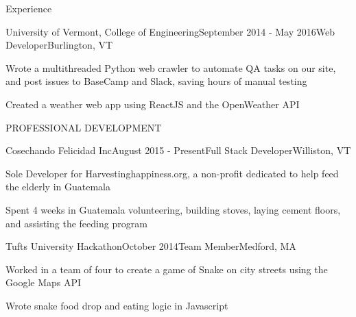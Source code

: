 \documentclass{resume} %
\begin{document}
\begin{rSection}{Experience}

\begin{rSubsection}{University of Vermont, College of Engineering}{September 2014 - May 2016}{Web Developer}{Burlington, VT}

\item Wrote a multithreaded Python web crawler to automate QA tasks on our site, and post issues to BaseCamp and Slack, saving hours of manual testing
\item Created a weather web app using ReactJS and the OpenWeather API

\end{rSubsection}


\end{rSection}



\begin{rSection}{PROFESSIONAL DEVELOPMENT}


\begin{rSubsection}{Cosechando Felicidad Inc}{August 2015 - Present}{Full Stack Developer}{Williston, VT}

\item Sole Developer for Harvestinghappiness.org, a non-profit dedicated to help feed the elderly in Guatemala
\item Spent 4 weeks in Guatemala volunteering, building stoves, laying cement floors, and assisting the feeding program

\end{rSubsection}


\begin{rSubsection}{Tufts University Hackathon}{October 2014}{Team Member}{Medford, MA}

\item Worked in a team of four to create a game of Snake on city streets using the Google Maps API
\item Wrote snake food drop and eating logic in Javascript

\end{rSubsection}

\end{rSection}
\end{document}
